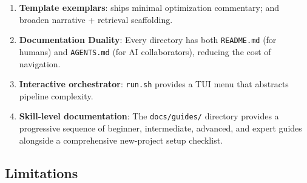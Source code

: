 \documentclass[
  english,
]{article}
\providecommand{\tightlist}{%
  \setlength{\itemsep}{0pt}\setlength{\parskip}{0pt}}
\begin{document}
\begin{enumerate}
\def\labelenumi{\arabic{enumi}.}
\tightlist
\item
  \textbf{Template exemplars}:  ships
  minimal optimization commentary;  and
   broaden narrative + retrieval
  scaffolding.
\item
  \textbf{Documentation Duality}: Every directory has both
  \texttt{README.md} (for humans) and \texttt{AGENTS.md} (for AI
  collaborators), reducing the cost of navigation.
\item
  \textbf{Interactive orchestrator}: \texttt{run.sh} provides a TUI menu
  that abstracts pipeline complexity.
\item
  \textbf{Skill-level documentation}: The \texttt{docs/guides/}
  directory provides a progressive sequence of beginner, intermediate,
  advanced, and expert guides alongside a comprehensive new-project
  setup checklist.
\end{enumerate}

\subsection{Limitations}\label{limitations}
\end{document}
